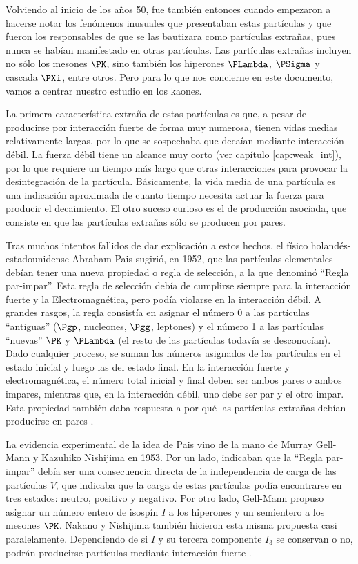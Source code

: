 Volviendo al inicio de los años 50, fue también entonces cuando empezaron a hacerse notar los fenómenos inusuales que presentaban estas partículas y que fueron los responsables de que se las bautizara como partículas extrañas, pues nunca se habían manifestado en otras partículas. Las partículas extrañas incluyen no sólo los mesones $\PK$, sino también los hiperones $\PLambda$, $\PSigma$ y cascada $\PXi$, entre otros. Pero para lo que nos concierne en este documento, vamos a centrar nuestro estudio en los kaones.

La primera característica extraña de estas partículas es que, a pesar de producirse por interacción fuerte de forma muy numerosa, tienen vidas medias relativamente largas, por lo que se sospechaba que decaían mediante interacción débil. La fuerza débil tiene un alcance muy corto (ver capítulo \ref{cap:weak_int}), por lo que requiere un tiempo más largo que otras interacciones para provocar la desintegración de la partícula. Básicamente, la vida media de una partícula es una indicación aproximada de cuanto tiempo necesita actuar la fuerza para producir el decaimiento. El otro suceso curioso es el de producción asociada, que consiste en que las partículas extrañas sólo se producen por pares.  

Tras muchos intentos fallidos de dar explicación a estos hechos, el físico holandés-estadounidense Abraham Pais sugirió, en 1952, que las partículas elementales debían tener una nueva propiedad o regla de selección, a la que denominó ``Regla par-impar''. Esta regla de selección debía de cumplirse siempre para la interacción fuerte y la Electromagnética, pero podía violarse en la interacción débil. A grandes rasgos, la regla consistía en asignar el número 0 a las partículas ``antiguas'' ($\Pgp$, nucleones, $\Pgg$, leptones) y el número 1 a las partículas ``nuevas'' $\PK$ y $\PLambda$ (el resto de las partículas todavía se desconocían). Dado cualquier proceso, se suman los números asignados de las partículas en el estado inicial y luego las del estado final. En la interacción fuerte y electromagnética, el número total inicial y final deben ser ambos pares o ambos impares, mientras que, en la interacción débil, uno debe ser par y el otro impar. Esta propiedad también daba respuesta a por qué las partículas extrañas debían producirse en pares \cite{Pais}.

La evidencia experimental de la idea de Pais vino de la mano de Murray Gell-Mann y Kazuhiko Nishijima en 1953. Por un lado, indicaban que la ``Regla par-impar'' debía ser una consecuencia directa de la independencia de carga de las partículas $V$, que indicaba que la carga de estas partículas podía encontrarse en tres estados: neutro, positivo y negativo. Por otro lado, Gell-Mann propuso asignar un número entero de isospín $I$ a los hiperones y un semientero a los mesones $\PK$. Nakano y Nishijima también hicieron esta misma propuesta casi paralelamente. Dependiendo de si $I$ y su tercera componente $I_3$ se conservan o no, podrán producirse partículas mediante interacción fuerte \cite{nakano}.

